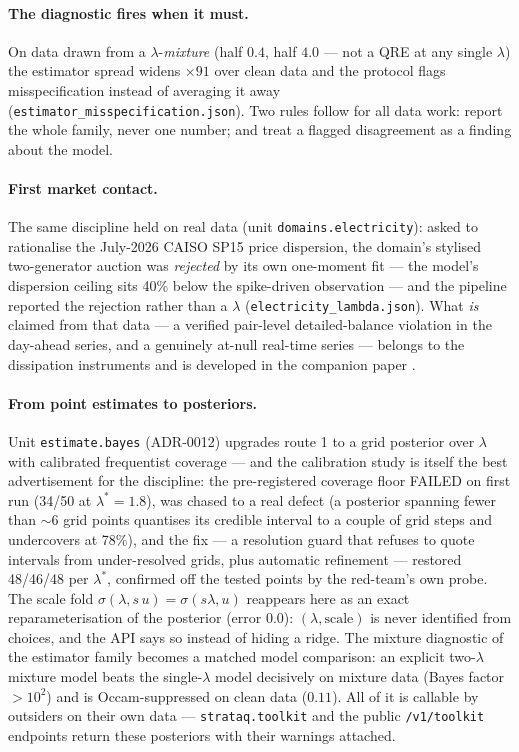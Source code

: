 \paragraph{The diagnostic fires when it must.} On data drawn from a
$\lambda$-\emph{mixture} (half $0.4$, half $4.0$ --- not a QRE at any single
$\lambda$) the estimator spread widens $\times 91$ over clean data and the
protocol flags misspecification instead of averaging it away
(\texttt{estimator\_misspecification.json}). Two rules follow for all data
work: report the whole family, never one number; and treat a flagged
disagreement as a finding about the model.

\paragraph{First market contact.} The same discipline held on real data
(unit \texttt{domains.electricity}): asked to rationalise the July-2026
CAISO SP15 price dispersion, the domain's stylised two-generator auction
was \emph{rejected} by its own one-moment fit --- the model's dispersion
ceiling sits 40\% below the spike-driven observation --- and the pipeline
reported the rejection rather than a $\lambda$
(\texttt{electricity\_lambda.json}). What \emph{is} claimed from that data
--- a verified pair-level detailed-balance violation in the day-ahead
series, and a genuinely at-null real-time series --- belongs to the
dissipation instruments and is developed in the companion paper
\citep{p3}.

\paragraph{From point estimates to posteriors.} Unit \texttt{estimate.bayes}
(ADR-0012) upgrades route 1 to a grid posterior over $\lambda$ with
calibrated frequentist coverage --- and the calibration study is itself the
best advertisement for the discipline: the pre-registered coverage floor
FAILED on first run (34/50 at $\lambda^* = 1.8$), was chased to a real
defect (a posterior spanning fewer than ${\sim}6$ grid points quantises its
credible interval to a couple of grid steps and undercovers at 78\%), and
the fix --- a resolution guard that refuses to quote intervals from
under-resolved grids, plus automatic refinement --- restored 48/46/48 per
$\lambda^*$, confirmed off the tested points by the red-team's own probe.
The scale fold $\sigma(\lambda, s\,u) = \sigma(s\lambda, u)$ reappears here
as an exact reparameterisation of the posterior (error $0.0$): $(\lambda,
\text{scale})$ is never identified from choices, and the API says so
instead of hiding a ridge. The mixture diagnostic of the estimator family
becomes a matched model comparison: an explicit two-$\lambda$ mixture model
beats the single-$\lambda$ model decisively on mixture data (Bayes factor
$>10^{2}$) and is Occam-suppressed on clean data ($0.11$). All of it is
callable by outsiders on their own data --- \texttt{strataq.toolkit} and
the public \texttt{/v1/toolkit} endpoints return these posteriors with
their warnings attached.
